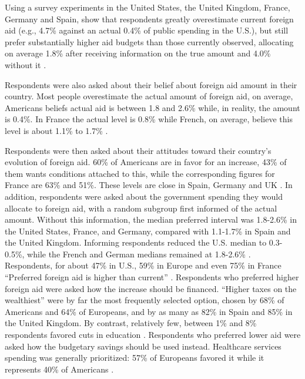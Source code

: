 Using a survey experiments in the United States, the United Kingdom, France, Germany and Spain, \citet{fabre_majority_2025} show that respondents greatly overestimate current foreign aid (e.g., 4.7\% against an actual 0.4\% of public spending in the U.S.), but still prefer substantially higher aid budgets than those currently observed, allocating on average 1.8\% after receiving information on the true amount and 4.0\% without it \citet[Figure 8]{fabre_majority_2025_si} .

Respondents were also asked about their belief about foreign aid amount in their country. Most people overestimate the actual amount of foreign aid, on average, Americans beliefs actual aid is between 1.8 and 2.6\% while, in reality, the amount is 0.4\%. In France the actual level is 0.8\% while French, on average, believe this level is about 1.1\% to 1.7\% \citep[Figure S20]{fabre_majority_2025_si}.


Respondents were then asked about their attitudes toward their country's evolution of foreign aid. 60\% of Americans are in favor for an increase, 43\% of them wants conditions attached to this, while the corresponding figures for France are 63\% and 51\%. These levels are close in Spain, Germany and UK \citep[Figure 6]{fabre_majority_2025_si}. In addition, respondents were asked about the government spending they would allocate to foreign aid, with a random subgroup first informed of the actual amount. Without this information, the median preferred interval was 1.8-2.6\% in the United States, France, and Germany, compared with 1.1-1.7\% in Spain and the United Kingdom. Informing respondents reduced the U.S. median to 0.3-0.5\%, while the French and German medians remained at 1.8-2.6\% \citep[Figure S20-S21]{fabre_majority_2025_si}. Respondents, for about 47\% in U.S., 59\% in Europe and even 75\% in France ``Preferred foreign aid is higher than current'' \citep[Figure S23]{fabre_majority_2025_si}. Respondents who preferred higher foreign aid were asked how the increase should be financed. ``Higher taxes on the wealthiest'' were by far the most frequently selected option, chosen by 68\% of Americans and 64\% of Europeans, and by as many as 82\% in Spain and 85\% in the United Kingdom. By contrast, relatively few, between 1\% and 8\% respondents favored cuts in education \citep[Figure S24]{fabre_majority_2025_si}. Respondents who preferred lower aid were asked how the budgetary savings should be used instead. Healthcare services spending was generally prioritized: 57\% of Europeans favored it while it represents 40\% of Americans \citep[Figure S25]{fabre_majority_2025_si}.


